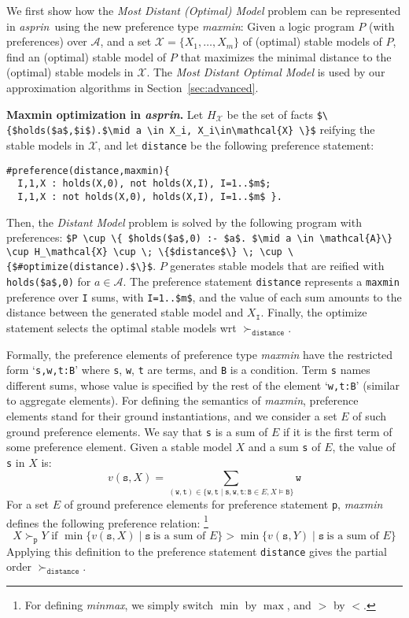 \documentclass[a4paper,UKenglish]{oasics}
\newcommand{\lm}[1]{\lstinline[mathescape=true]!#1!}
\newcommand{\sysfont}{\textit}
\newcommand{\asprin}{\sysfont{asprin}}
\newcommand{\mysubsection}[2]{\smallskip\noindent\textbf{#1.}}
\begin{document}
We first show how the \emph{Most Distant (Optimal) Model} problem can be represented in \asprin\ 
using the new preference type \textit{maxmin}: %
Given a logic program $P$ (with preferences) over $\mathcal{A}$, 
and a set $\mathcal{X}=\{ X_1, \ldots, X_m \}$ of (optimal) stable models of $P$, 
find an (optimal) stable model of $P$ that 
maximizes the minimal distance to the (optimal) stable models in $\mathcal{X}$.
%
%
The \emph{Most Distant Optimal Model} is used by our approximation algorithms in Section~\ref{sec:advanced}.

\mysubsection{Maxmin optimization in \asprin}{sec:maxmin}
%
%
Let $H_\mathcal{X}$ be the set of facts \lstinline[mathescape=true]!$\{$holds($a$,$i$).$\mid a \in X_i, X_i\in\mathcal{X} \}$!
reifying the stable models in $\mathcal{X}$,  
and let \lstinline!distance! be the following preference statement:
%
\begin{lstlisting}[mathescape=true]
#preference(distance,maxmin){
  I,1,X : holds(X,0), not holds(X,I), I=1..$m$;
  I,1,X : not holds(X,0), holds(X,I), I=1..$m$ }.
\end{lstlisting}
%
Then, the \emph{Distant Model} problem is solved by the following program with preferences:
\lstinline[mathescape=true]!$P \cup \{ $holds($a$,0) :- $a$. $\mid a \in \mathcal{A}\} \cup H_\mathcal{X} \cup \; \{$distance$\} \; \cup \{$#optimize(distance).$\}$!.
%
$P$ generates stable models that are reified with \lm{holds($a$,0)} for $a \in \mathcal{A}$. 
%
The preference statement \lstinline!distance! represents a \lstinline!maxmin! preference 
over \lstinline!I! sums, with \lstinline[mathescape=true]!I=1..$m$!,
and the value of each sum amounts to the distance between %
the generated stable model and $X_\mathtt{I}$.
%
Finally, the optimize statement selects the optimal stable models wrt $\succ_\mathtt{distance}$.

Formally, the preference elements of preference type \textit{maxmin} have the restricted form
`\lm{s,w,t:B}'
%
where \lm{s}, \lm{w}, \lm{t} are terms, and \lm{B} is a condition.
%
Term \lm{s} names different sums,
whose value is specified by the rest of the element `\lm{w,t:B}'
(similar to aggregate elements).
%
%
%
For defining the semantics of \textit{maxmin}, 
preference elements stand for their ground instantiations, 
and we consider a set $E$ of such ground preference elements.
%
We say that \lm{s} is a sum of $E$ if it is the first term of some preference element.
Given a stable model $X$ and a sum \lm{s} of $E$, the value of \lm{s} in $X$ is:
\[\textstyle
v(\mathtt{s},X)=\sum_{(\mathtt{w},\mathtt{t})\in\{\mathtt{w},\mathtt{t}\mid \mathtt{s,w,t:B}\in E, X\models \mathtt{B}\}}\mathtt{w}
\]
For a set $E$ of ground preference elements for preference statement \lm{p}, 
\textit{maxmin} defines the following preference relation:%
\footnote{For defining \textit{minmax}, we simply switch $\min$ by $\max$, and $>$ by $<$.}
\[
X \succ_\mathtt{p} Y \text{ if } \min \{ v(\mathtt{s},X) \mid \mathtt{s} \ \text{is a sum of } E \} > \min \{ v(\mathtt{s},Y) \mid \mathtt{s} \ \text{is a sum of } E \} 
\]
Applying this definition to the preference statement \lm{distance} gives the partial order $\succ_\mathtt{distance}$.
%
%
\end{document}
